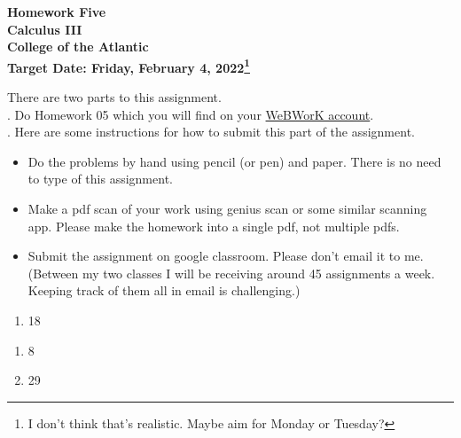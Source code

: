 \documentclass[12pt]{article}
\begin{document}
\pagestyle{empty}
 
\begin{center}
{\LARGE {\bf Homework Five}}\\
\bigskip
{\Large {\bf Calculus III}}\\
\bigskip
{\Large {\bf College of the Atlantic}}\\
\bigskip
{ {\bf Target Date: Friday, February 4, 2022\footnote{I don't think
      that's realistic.  Maybe aim for Monday or Tuesday?}}}\\  
\end{center}
\medskip


\noindent There are two parts to this assignment.\\

.  Do Homework 05 which you will find 
on your \href{https://webwork.runestone.academy/webwork2/coa-feldman-es3028m-winter-2022/}{WeBWorK account}.\\


.  Here are some
instructions for how to submit this part of the assignment.
\begin{itemize}
\item Do the problems by hand using pencil (or pen) and paper.
  There is no need to type of this assignment.
\item Make a pdf scan of your work using genius scan or some
  similar scanning app.  Please make the homework into a single
  pdf, not multiple pdfs.
\item Submit the assignment on google classroom.  Please don't
  email it to me.  (Between my two classes I will be receiving
  around 45 assignments a week.  Keeping track of them all in email 
  is challenging.)\\
\end{itemize}


\begin{enumerate}
\setlength{\itemsep}{-1mm}
\item 18
\end{enumerate}

\begin{enumerate}
\setlength{\itemsep}{-1mm}
\item 8
\item 29
\end{enumerate}
\end{document}
